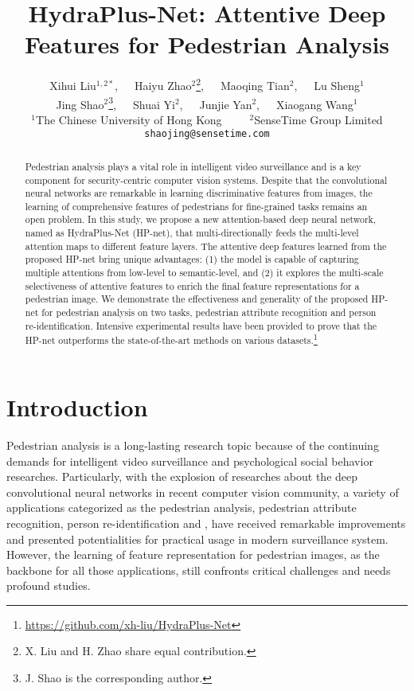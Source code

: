 \documentclass[10pt,twocolumn,letterpaper]{article}
\begin{document}
\title{HydraPlus-Net: Attentive Deep Features for Pedestrian Analysis}

\author{Xihui Liu$^{1,2*}$,~~~Haiyu Zhao$^{2}$\thanks{X. Liu and H. Zhao share equal contribution.},~~~Maoqing Tian$^2$,~~~Lu Sheng$^1$\\
\vspace{-10pt}
Jing Shao$^{2}$\thanks{J. Shao is the corresponding author.},~~~Shuai Yi$^2$,~~~Junjie Yan$^2$,~~~Xiaogang Wang$^1$\\
{$^1$The Chinese University of Hong Kong~~~~~$^2$SenseTime Group Limited}\\
{\tt\small shaojing@sensetime.com}
}


\maketitle


\begin{abstract}
Pedestrian analysis plays a vital role in intelligent video surveillance and is a key component for security-centric computer vision systems.
Despite that the convolutional neural networks are remarkable in learning discriminative features from images, the learning of comprehensive features of pedestrians for fine-grained tasks remains an open problem.
In this study, we propose a new attention-based deep neural network, named as HydraPlus-Net (HP-net), that multi-directionally feeds the multi-level attention maps to different feature layers.
The attentive deep features learned from the proposed HP-net bring unique advantages:
(1) the model is capable of capturing multiple attentions from low-level to semantic-level, and (2) it explores the multi-scale selectiveness of attentive features to enrich the final feature representations for a pedestrian image.
We demonstrate the effectiveness and generality of the proposed HP-net for pedestrian analysis on two tasks, \ie pedestrian attribute recognition and person re-identification.
Intensive experimental results have been provided to prove that the HP-net outperforms the state-of-the-art methods on various datasets.\footnote{\url{https://github.com/xh-liu/HydraPlus-Net}}
\end{abstract}




\section{Introduction}
\label{sec:intro}
Pedestrian analysis is a long-lasting research topic because of the continuing demands for intelligent video surveillance and psychological social behavior researches.
Particularly, with the explosion of researches about the deep convolutional neural networks in recent computer vision community, a variety of applications categorized as the pedestrian analysis, \eg pedestrian attribute recognition, person re-identification and \etc, have received remarkable improvements and presented potentialities for practical usage in modern surveillance system.
However, the learning of feature representation for pedestrian images, as the backbone for all those applications, still confronts critical challenges and needs profound studies.
\end{document}
